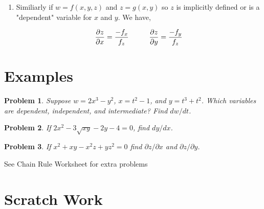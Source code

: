 \documentclass[11pt]{article}
\newtheorem{problem}{Problem}
\begin{document}
\begin{enumerate}
\begin{equation*}
    \frac{\partial w}{\partial x} = \frac{\partial f}{\partial x} \frac{\partial x}{\partial x} + \frac{\partial f}{\partial y} \frac{dy}{dx} = 0
\end{equation*}

Solving this we get,

\begin{equation*}
   \frac{dy}{dx} = \frac{-f_x}{f_y}
\end{equation*}

\item Similiarly if $w = f(x,y,z)$ and $z = g(x,y)$ so $z$ is implicitly defined or is a "dependent" variable for $x$ and $y$. We have,

\begin{equation*}
    \frac{\partial z}{\partial x} = \frac{-f_x}{f_z} \hspace{1 cm}  \frac{\partial z}{\partial y} = \frac{-f_y}{f_z}
\end{equation*}

\end{enumerate}




\section{Examples}

\begin{problem}
    Suppose $w = 2x^3-y^2$, $x=t^2-1$, and $y=t^3+t^2$. Which variables are dependent, independent, and intermediate? Find $dw/dt$.
\end{problem}

\vspace{5cm}

\begin{problem}
If $2x^2 - 3\sqrt{xy}-2y -4= 0$, find $dy/dx$.
\end{problem}

\vspace{5cm}

\begin{problem}
    If $x^2+xy-x^2z+yz^2 = 0$ find $\partial z/\partial x$ and $\partial z/\partial y$.
\end{problem}


\newpage
See Chain Rule Worksheet for extra problems



\section{Scratch Work}
\end{document}
